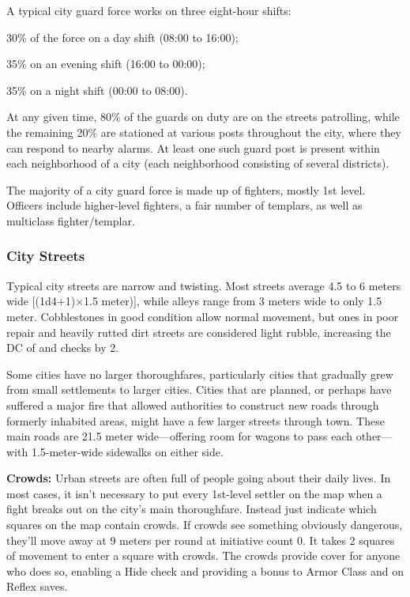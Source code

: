 A typical city guard force works on three eight-hour shifts:
\begin{itemize*}
\item 30\% of the force on a day shift (08:00 to 16:00);
\item 35\% on an evening shift (16:00 to 00:00);
\item 35\% on a night shift (00:00 to 08:00).
\end{itemize*}

At any given time, 80\% of the guards on duty are on the streets patrolling, while the remaining 20\% are stationed at various posts throughout the city, where they can respond to nearby alarms. At least one such guard post is present within each neighborhood of a city (each neighborhood consisting of several districts).

The majority of a city guard force is made up of fighters, mostly 1st level. Officers include higher-level fighters, a fair number of templars, as well as multiclass fighter/templar.

\subsubsection{City Streets}
Typical city streets are narrow and twisting. Most streets average 4.5 to 6 meters wide [(1d4+1)$\times$1.5 meter)], while alleys range from 3 meters wide to only 1.5 meter. Cobblestones in good condition allow normal movement, but ones in poor repair and heavily rutted dirt streets are considered light rubble, increasing the DC of  and  checks by 2.

Some cities have no larger thoroughfares, particularly cities that gradually grew from small settlements to larger cities. Cities that are planned, or perhaps have suffered a major fire that allowed authorities to construct new roads through formerly inhabited areas, might have a few larger streets through town. These main roads are 21.5 meter wide---offering room for wagons to pass each other---with 1.5-meter-wide sidewalks on either side.

\textbf{Crowds:} Urban streets are often full of people going about their daily lives. In most cases, it isn't necessary to put every 1st-level settler on the map when a fight breaks out on the city's main thoroughfare. Instead just indicate which squares on the map contain crowds. If crowds see something obviously dangerous, they'll move away at 9 meters per round at initiative count 0. It takes 2 squares of movement to enter a square with crowds. The crowds provide cover for anyone who does so, enabling a Hide check and providing a bonus to Armor Class and on Reflex saves.

